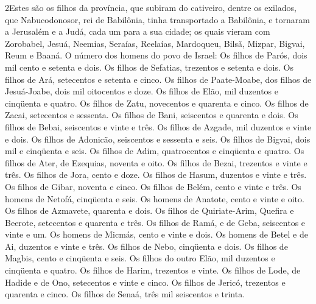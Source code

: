 \lettrine{2} Estes são os filhos da província, que subiram do
cativeiro, dentre os exilados, que Nabucodonosor, rei de Babilônia,
tinha transportado a Babilônia, e tornaram a Jerusalém e a Judá,
cada um para a sua cidade; os quais vieram com Zorobabel, Jesuá,
Neemias, Seraías, Reelaías, Mardoqueu, Bilsã, Mizpar, Bigvai, Reum e
Baaná. O número dos homens do povo de Israel: Os filhos de
Parós, dois mil cento e setenta e dois. Os filhos de Sefatias,
trezentos e setenta e dois. Os filhos de Ará, setecentos e
setenta e cinco. Os filhos de Paate-Moabe, dos filhos de
Jesuá-Joabe, dois mil oitocentos e doze. Os filhos de Elão, mil
duzentos e cinqüenta e quatro. Os filhos de Zatu, novecentos e
quarenta e cinco. Os filhos de Zacai, setecentos e sessenta.
Os filhos de Bani, seiscentos e quarenta e dois. Os
filhos de Bebai, seiscentos e vinte e três. Os filhos de
Azgade, mil duzentos e vinte e dois. Os filhos de Adonicão,
seiscentos e sessenta e seis. Os filhos de Bigvai, dois mil e
cinqüenta e seis. Os filhos de Adim, quatrocentos e cinqüenta
e quatro. Os filhos de Ater, de Ezequias, noventa e oito.
Os filhos de Bezai, trezentos e vinte e três. Os
filhos de Jora, cento e doze. Os filhos de Hasum, duzentos e
vinte e três. Os filhos de Gibar, noventa e cinco. Os
filhos de Belém, cento e vinte e três. Os homens de Netofá,
cinqüenta e seis. Os homens de Anatote, cento e vinte e oito.
Os filhos de Azmavete, quarenta e dois. Os filhos de
Quiriate-Arim, Quefira e Beerote, setecentos e quarenta e três.
Os filhos de Ramá, e de Geba, seiscentos e vinte e um.
Os homens de Micmás, cento e vinte e dois. Os homens
de Betel e de Ai, duzentos e vinte e três. Os filhos de Nebo,
cinqüenta e dois. Os filhos de Magbis, cento e cinqüenta e
seis. Os filhos do outro Elão, mil duzentos e cinqüenta e
quatro. Os filhos de Harim, trezentos e vinte. Os
filhos de Lode, de Hadide e de Ono, setecentos e vinte e cinco.
Os filhos de Jericó, trezentos e quarenta e cinco. Os
filhos de Senaá, três mil seiscentos e trinta.

